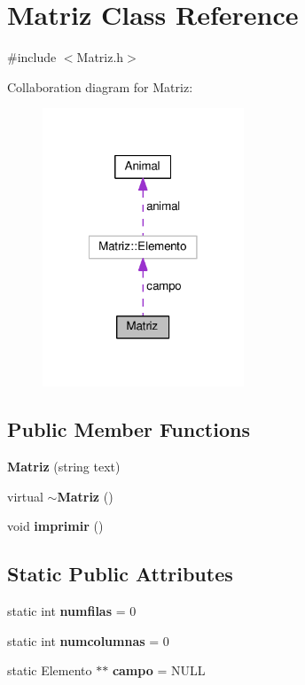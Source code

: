 \section{Matriz Class Reference}
\label{class_matriz}


{\ttfamily \#include $<$Matriz.\-h$>$}



Collaboration diagram for Matriz\-:
\nopagebreak
\begin{figure}[H]
\begin{center}
\leavevmode
\includegraphics[width=170pt]{class_matriz__coll__graph}
\end{center}
\end{figure}
\subsection*{Public Member Functions}
\begin{DoxyCompactItemize}
\item 
{\bf Matriz} (string text)
\item 
virtual {\bf $\sim$\-Matriz} ()
\item 
void {\bf imprimir} ()
\end{DoxyCompactItemize}
\subsection*{Static Public Attributes}
\begin{DoxyCompactItemize}
\item 
static int {\bf numfilas} = 0
\item 
static int {\bf numcolumnas} = 0
\item 
static Elemento $\ast$$\ast$ {\bf campo} = N\-U\-L\-L
\end{DoxyCompactItemize}


